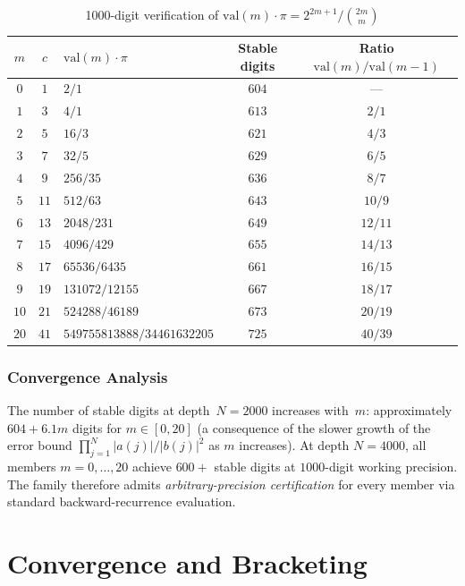 \documentclass[11pt,a4paper]{article}
\theoremstyle{plain}
\theoremstyle{remark}
\begin{document}
\begin{table}[h]
\centering
\caption{1000-digit verification of $\mathrm{val}(m)\cdot\pi = 2^{2m+1}/\binom{2m}{m}$}\label{tab:1000dp}
\begin{tabular}{@{}cclcc@{}}
\toprule
$m$ & $c$ & $\mathrm{val}(m)\cdot\pi$ & Stable digits & Ratio $\mathrm{val}(m)/\mathrm{val}(m{-}1)$ \\
\midrule
$0$ & $1$ & $2/1$                       & $604$ & --- \\
$1$ & $3$ & $4/1$                       & $613$ & $2/1$ \\
$2$ & $5$ & $16/3$                      & $621$ & $4/3$ \\
$3$ & $7$ & $32/5$                      & $629$ & $6/5$ \\
$4$ & $9$ & $256/35$                    & $636$ & $8/7$ \\
$5$ & $11$ & $512/63$                   & $643$ & $10/9$ \\
$6$ & $13$ & $2048/231$                 & $649$ & $12/11$ \\
$7$ & $15$ & $4096/429$                 & $655$ & $14/13$ \\
$8$ & $17$ & $65536/6435$               & $661$ & $16/15$ \\
$9$ & $19$ & $131072/12155$             & $667$ & $18/17$ \\
$10$ & $21$ & $524288/46189$            & $673$ & $20/19$ \\
$20$ & $41$ & $549755813888/34461632205$ & $725$ & $40/39$ \\
\bottomrule
\end{tabular}
\end{table}

\subsubsection{Convergence Analysis}\label{sec:conv-analysis}

The number of stable digits at depth~$N{=}2000$ increases with~$m$:
approximately $604 + 6.1m$ digits for $m \in [0,20]$
(a consequence of the slower growth of the error bound
$\prod_{j=1}^N |a(j)|/|b(j)|^2$ as $m$ increases).
At depth $N{=}4000$, all members $m = 0,\ldots,20$
achieve $600{+}$ stable digits at $1000$-digit working precision.
The family therefore admits \emph{arbitrary-precision certification}
for every member via standard backward-recurrence evaluation.

\section{Convergence and Bracketing}\label{sec:conv}
\end{document}
